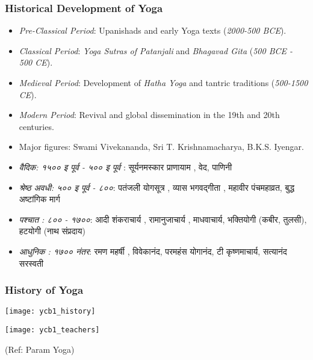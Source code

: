 \begin{frame}[fragile]\frametitle{Historical Development of Yoga}

      \begin{itemize}
		\item \textit{Pre-Classical Period}: Upanishads and early Yoga texts (\textit{2000-500 BCE}).
		\item \textit{Classical Period}: \textit{Yoga Sutras of Patanjali} and \textit{Bhagavad Gita} (\textit{500 BCE - 500 CE}).
		\item \textit{Medieval Period}: Development of \textit{Hatha Yoga} and tantric traditions (\textit{500-1500 CE}).
		\item \textit{Modern Period}: Revival and global dissemination in the 19th and 20th centuries.
		\item Major figures: Swami Vivekananda, Sri T. Krishnamacharya, B.K.S. Iyengar.
		\item \textit{वैदिक: १५०० इ पूर्व - ५०० इ पूर्व }: सूर्यनमस्कार प्राणायाम , वेद, पाणिनी 
		\item \textit{श्रेष्ठ अवधी: ५०० इ पूर्व - ८००}: पतंजली  योगसूत्र , व्यास भगवद्गीता , महावीर पंचमहाव्रत, बुद्ध अष्टांगिक मार्ग 
		\item \textit{पश्चात : ८०० - १७००}: आदी शंकराचार्य , रामानुजाचार्य , माधवाचार्य, भक्तियोगी (कबीर, तुलसी), हटयोगी (नाथ संप्रदाय)
		\item \textit{आधुनिक : १७०० नंतर}: रमण महर्षी , विवेकानंद, परमहंस योगानंद, टी कृष्णमाचार्य, सत्यानंद सरस्वती 
		
	  \end{itemize}

\end{frame}

\begin{frame}[fragile]\frametitle{History of Yoga}
      \begin{center}
        \texttt{[image: ycb1\_history]}

        \texttt{[image: ycb1\_teachers]}

		{\tiny (Ref: Param Yoga)}		
        \end{center}

\end{frame}

